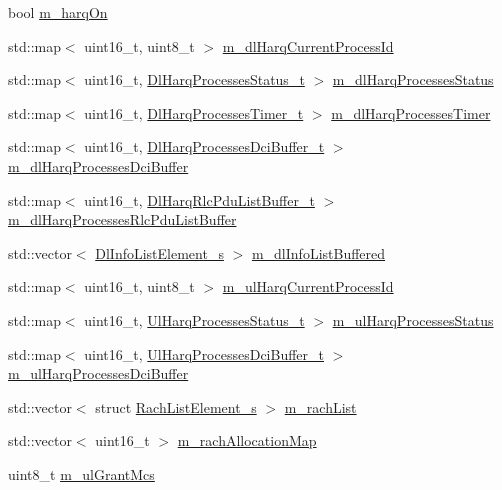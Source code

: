 \begin{DoxyCompactItemize}
\item 
bool \hyperlink{classns3_1_1PfFfMacScheduler_a20ee9882187d440870b2a88b63fcb7e9}{m\+\_\+harq\+On}
\item 
std\+::map$<$ uint16\+\_\+t, uint8\+\_\+t $>$ \hyperlink{classns3_1_1PfFfMacScheduler_a792f015651334a9e688d534367f29155}{m\+\_\+dl\+Harq\+Current\+Process\+Id}
\item 
std\+::map$<$ uint16\+\_\+t, \hyperlink{namespacens3_a457b3571b67ff17d042e9894e90e2ce2}{Dl\+Harq\+Processes\+Status\+\_\+t} $>$ \hyperlink{classns3_1_1PfFfMacScheduler_a438c2319e01eaac65f64cbd82b3e8089}{m\+\_\+dl\+Harq\+Processes\+Status}
\item 
std\+::map$<$ uint16\+\_\+t, \hyperlink{namespacens3_a39413ade536de4b1c82d6c0074cc703e}{Dl\+Harq\+Processes\+Timer\+\_\+t} $>$ \hyperlink{classns3_1_1PfFfMacScheduler_ab115ef9abb936f35aeb5979a8ed8928d}{m\+\_\+dl\+Harq\+Processes\+Timer}
\item 
std\+::map$<$ uint16\+\_\+t, \hyperlink{namespacens3_af25599bf8f9f564075c005759c9af18c}{Dl\+Harq\+Processes\+Dci\+Buffer\+\_\+t} $>$ \hyperlink{classns3_1_1PfFfMacScheduler_af3c0c393dc246b7b6a907539362c935b}{m\+\_\+dl\+Harq\+Processes\+Dci\+Buffer}
\item 
std\+::map$<$ uint16\+\_\+t, \hyperlink{namespacens3_a4c0cbd1e72f1c667f8b5879655f13210}{Dl\+Harq\+Rlc\+Pdu\+List\+Buffer\+\_\+t} $>$ \hyperlink{classns3_1_1PfFfMacScheduler_acf9952b5bb3d26644b5e25054ca6e385}{m\+\_\+dl\+Harq\+Processes\+Rlc\+Pdu\+List\+Buffer}
\item 
std\+::vector$<$ \hyperlink{structns3_1_1DlInfoListElement__s}{Dl\+Info\+List\+Element\+\_\+s} $>$ \hyperlink{classns3_1_1PfFfMacScheduler_af3c266623addc28fc6ecd97901183a2f}{m\+\_\+dl\+Info\+List\+Buffered}
\item 
std\+::map$<$ uint16\+\_\+t, uint8\+\_\+t $>$ \hyperlink{classns3_1_1PfFfMacScheduler_aff9dac165a5c80c99f237adf365321d6}{m\+\_\+ul\+Harq\+Current\+Process\+Id}
\item 
std\+::map$<$ uint16\+\_\+t, \hyperlink{namespacens3_af765c4daaafe4ea4809c1041fc196629}{Ul\+Harq\+Processes\+Status\+\_\+t} $>$ \hyperlink{classns3_1_1PfFfMacScheduler_a5d5e9dcdbb7d0a291fe397ba7b746d04}{m\+\_\+ul\+Harq\+Processes\+Status}
\item 
std\+::map$<$ uint16\+\_\+t, \hyperlink{namespacens3_a042cbd6bf67e73911cba35b8c070223d}{Ul\+Harq\+Processes\+Dci\+Buffer\+\_\+t} $>$ \hyperlink{classns3_1_1PfFfMacScheduler_a694ef4299832b3652468b0898601b2de}{m\+\_\+ul\+Harq\+Processes\+Dci\+Buffer}
\item 
std\+::vector$<$ struct \hyperlink{structns3_1_1RachListElement__s}{Rach\+List\+Element\+\_\+s} $>$ \hyperlink{classns3_1_1PfFfMacScheduler_a850a31ab66c0a1d24207311ceee03ce7}{m\+\_\+rach\+List}
\item 
std\+::vector$<$ uint16\+\_\+t $>$ \hyperlink{classns3_1_1PfFfMacScheduler_a755c1bfd84bd392a07aa370cb4ced071}{m\+\_\+rach\+Allocation\+Map}
\item 
uint8\+\_\+t \hyperlink{classns3_1_1PfFfMacScheduler_a915ee203b48875c6cb276bb46d866c2b}{m\+\_\+ul\+Grant\+Mcs}
\end{DoxyCompactItemize}
